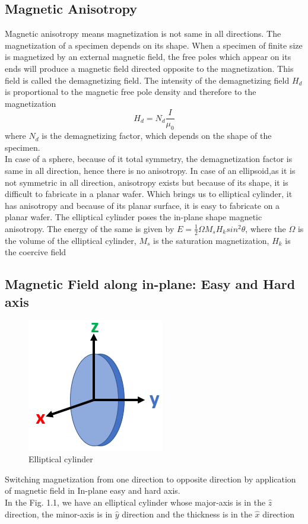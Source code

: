 \subsection{Magnetic Anisotropy}
Magnetic anisotropy means magnetization is not same in all directions. The magnetization of a specimen depends on its shape. When a specimen of finite size is magnetized by an external magnetic field, the free poles which appear on its ends will produce a magnetic field directed opposite to the magnetization. This field is called the demagnetizing field. The intensity of the demagnetizing field $H_d$ is proportional to the magnetic free pole density and therefore to the magnetization
\[H_d=N_d\frac{I}{\mu_0}\]
where $N_d$ is the demagnetizing factor, which depends on the shape of the specimen.\\
In case of a sphere, because of it total symmetry, the demagnetization factor is same in all direction, hence there is no anisotropy.
In case of an ellipsoid,as it is not symmetric in all direction, anisotropy exists but because of its shape, it is difficult to fabricate in a planar wafer.
Which brings us to elliptical cylinder, it has anisotropy and because of its planar surface, it is easy to fabricate on a planar wafer. The elliptical cylinder poses the in-plane shape magnetic anisotropy. The energy of the same is given by $E=\frac{1}{2}\Omega M_s H_k sin^2 \theta$, where the $\Omega$ is the volume of the elliptical cylinder, $M_s$ is the saturation magnetization, $H_k$ is the coercive field

\subsection{Magnetic Field along in-plane: Easy and Hard axis}
\begin{figure}[H]
	\centering
   \includegraphics[scale=0.56]{Images/19.png} 
   \caption{Elliptical cylinder}
\end{figure} 
Switching magnetization from one direction to opposite direction by application of magnetic field in In-plane easy and hard axis. \\
In the Fig. 1.1, we have an elliptical cylinder whose major-axis is in the $\hat{z}$ direction, the minor-axis is in $\hat{y}$ direction and the thickness is in the $\hat{x}$ direction\\\\

